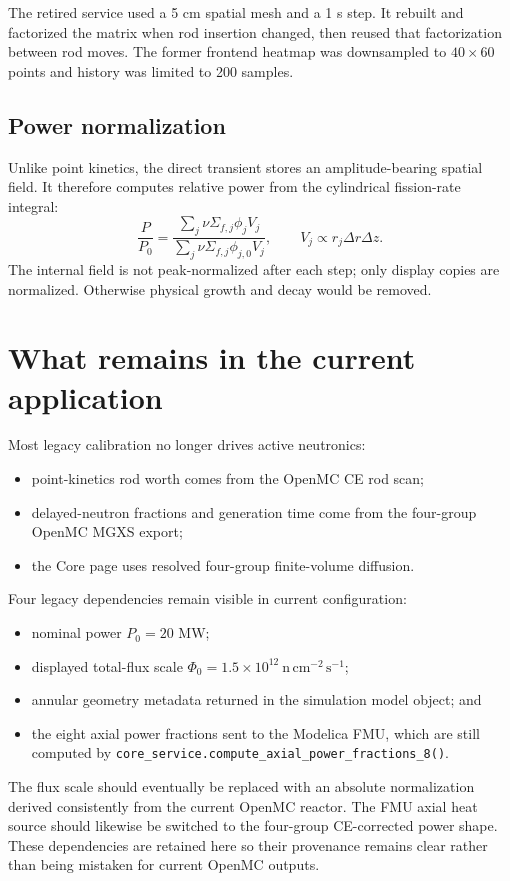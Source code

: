 \documentclass[11pt]{article}
\begin{document}
The retired service used a 5 cm spatial mesh and a 1 s step.  It rebuilt and
factorized the matrix when rod insertion changed, then reused that
factorization between rod moves.  The former frontend heatmap was downsampled
to $40\times60$ points and history was limited to 200 samples.

\subsection{Power normalization}

Unlike point kinetics, the direct transient stores an amplitude-bearing
spatial field.  It therefore computes relative power from the cylindrical
fission-rate integral:
\[
\frac{P}{P_0}=
\frac{\sum_j\nu\Sigma_{f,j}\phi_jV_j}
{\sum_j\nu\Sigma_{f,j}\phi_{j,0}V_j},
\qquad
V_j\propto r_j\Delta r\Delta z.
\]
The internal field is not peak-normalized after each step; only display copies
are normalized.  Otherwise physical growth and decay would be removed.

\section{What remains in the current application}

Most legacy calibration no longer drives active neutronics:
\begin{itemize}
  \item point-kinetics rod worth comes from the OpenMC CE rod scan;
  \item delayed-neutron fractions and generation time come from the four-group
        OpenMC MGXS export;
  \item the Core page uses resolved four-group finite-volume diffusion.
\end{itemize}

Four legacy dependencies remain visible in current configuration:
\begin{itemize}
  \item nominal power $P_0=20$ MW;
  \item displayed total-flux scale
        $\Phi_0=1.5\times10^{12}\ \mathrm{n\,cm^{-2}\,s^{-1}}$;
  \item annular geometry metadata returned in the simulation model object; and
  \item the eight axial power fractions sent to the Modelica FMU, which are
        still computed by
        \texttt{core\_service.compute\_axial\_power\_fractions\_8()}.
\end{itemize}
The flux scale should eventually be replaced with an absolute normalization
derived consistently from the current OpenMC reactor.  The FMU axial heat
source should likewise be switched to the four-group CE-corrected power shape.
These dependencies are retained here so their provenance remains clear rather
than being mistaken for current OpenMC outputs.
\end{document}
